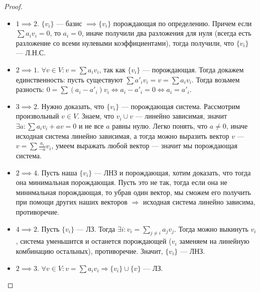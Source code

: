 \begin{proof}
    \slashn
     \begin{itemize}
	     \item $1 \implies 2$.  $\{v_i\}$ --- базис  $\implies \{v_i\}$ порождающая по определению. Причем если $\sum a_i v_i = 0$, то $a_i = 0$, иначе получили два разложения для нуля (всегда есть разложение со всеми нулевыми коэффициентами), тогда получили, что $\{v_i\}$ --- Л.Н.С.
         \item $2 \implies 1$.  $\forall v \in V\!: v = \sum a_i v_i$, так как $\{v_i\}$ --- порождающая. Тогда докажем единственность: пусть существуют $\sum a'_i v_i = v = \sum a_i v_i$. Тогда возьмем разность: $0 = \sum (a_i - a'_i) v_i \iff a_i - a'_i = 0 \iff a_i = a'_i$.
	     \item  $3 \implies 2$. Нужно доказать, что $\{v_i\}$ --- порождающая система. Рассмотрим произвольный $v \in V$. Знаем, что ${v_i} \cup {v}$ --- линейно зависимая, значит $\exists a: \sum a_i v_i + av = 0$ и не все $a$ равны нулю. Легко понять, что $a\neq 0$, иначе исходная система линейно зависимая, а тогда можно выразить вектор $v$ --- $v = \sum\frac{a_i}{-a}v_i$, умеем выражать любой вектор --- значит мы порождающая система.
         \item $2 \implies 4$. Пусть наша  $\{v_i\}$ --- ЛНЗ и порождающая, хотим доказать, что тогда она минимальная порождающая. Пусть это не так, тогда если она не минимальная порождающая, то убрав один вектор, мы сможем его получить при помощи других наших векторов  $\Rightarrow$ исходная система линейно зависима, противоречие.
         \item $4 \implies 2$. Пусть $\{v_i\}$ --- ЛЗ. Тогда $\exists i: v_i = \sum_{j \neq i}a_jv_j$. Тогда можно выкинуть $v_i$, система уменьшится и останется порождающей ($v_i$ заменяем на линейную комбинацию остальных), противоречие. Значит, $\{v_i\}$ --- ЛНЗ.
         \item $2 \implies 3$. $\forall v \in V: v = \sum a_iv_i \Rightarrow \{v_i\} \cup \{v\}$ --- ЛЗ.
    \end{itemize}
\end{proof}

